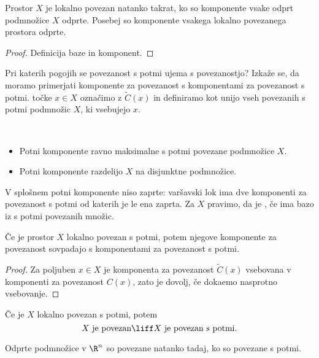 \begin{trditev}
    Prostor $X$ je lokalno povezan natanko takrat, ko so komponente vsake odprt podmnožice $X$ odprte. Posebej so komponente vsakega lokalno povezanega prostora odprte.
\end{trditev}

\begin{proof}
    Definicija baze in komponent.
\end{proof}

Pri katerih pogojih se povezanost s potmi ujema s povezanostjo? Izkaže se, da moramo primerjati komponente za povezanost s komponentami za povezanost s potmi.  točke $x \in X$ označimo z $\widetilde{C}(x)$ in definiramo kot unijo vseh povezanih s potmi podmnožic $X$, ki vsebujejo $x$.

\begin{opomba}
    \ 
    \begin{itemize}
        \item Potni komponente ravno maksimalne s potmi povezane podmnožice $X$.
        \item Potni komponente razdelijo $X$ na disjunktne podmnožice.
    \end{itemize}

    V splošnem potni komponente niso zaprte: varšavski lok ima dve komponenti za povezanost s potmi od katerih je le ena zaprta. Za $X$ pravimo, da je , če ima bazo iz s potmi povezanih množic.
\end{opomba}

\begin{izrek}
    Če je prostor $X$ lokalno povezan s potmi, potem njegove komponente za povezanost sovpadajo s komponentami za povezanost s potmi.
\end{izrek}

\begin{proof}
    Za poljuben $x \in X$ je komponenta za povezanost $\widetilde{C}(x)$ vsebovana v komponenti za povezanost $C(x)$, zato je dovolj, če dokaemo nasprotno vsebovanje.
\end{proof}

\newpage
\begin{posledica}
    Če je $X$ lokalno povezan s potmi, potem 
    $$X \text{ je povezan} \liff X \text{ je povezan s potmi}.$$
\end{posledica}

\begin{posledica}
    Odprte podmnožice v $\R^n$ so povezane natanko tadaj, ko so povezane s potmi.
\end{posledica}

